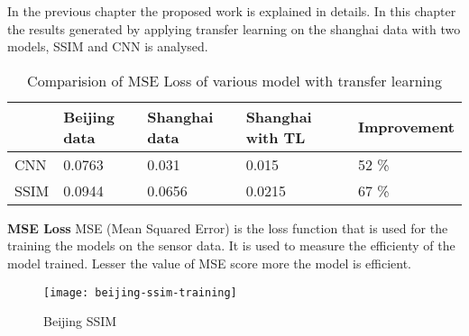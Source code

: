
In the previous chapter the proposed work is explained in details. In this chapter the results generated by applying transfer learning on the shanghai data with two models, SSIM and CNN is analysed.




\begin{table}[h]
\centering
\begin{tabular}[widht=\textwidth]{|l | l | l | l | l|}
\hline
 & Beijing data & Shanghai data  & Shanghai with TL & Improvement \\
\hline
CNN & 0.0763 & 0.031 & 0.015 & 52 \% \\

SSIM & 0.0944 & 0.0656 & 0.0215 & 67 \% \\
\hline
\end{tabular}
\caption{Comparision of MSE Loss of various model with transfer learning}
\label{tab:comparision-table}
\end{table}


\textbf{MSE Loss}
MSE (Mean Squared Error) is the loss function that is used for the training the models on the sensor data. It is used to measure the efficienty of the model trained. Lesser the value of MSE score more the model is efficient. \\

\begin{figure}[ht]
	\centering
	\texttt{[image: beijing-ssim-training]}
	\caption{Beijing SSIM}
	\label{fig:beijing-ssim-training}
\end{figure}


